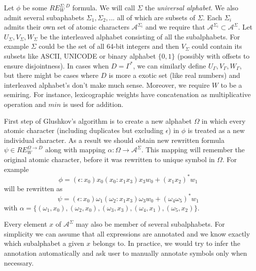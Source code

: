 \documentclass[journal]{journal}
\begin{document}
Let $\phi$ be some $RE_W^{\Sigma:D}$ formula. We will call $\Sigma$ the \textit{universal alphabet}. We also admit several subaphabets $\Sigma_1,\Sigma_2,...$ all of which are subsets of $\Sigma$. Each $\Sigma_i$ admits their own set of atomic characters $\mathcal{A}^{\Sigma_i}$ and we require that $\mathcal{A}^{\Sigma_i}\subset \mathcal{A}^{\Sigma}$.  Let $U_\Sigma,V_\Sigma,W_\Sigma$ be the interleaved alphabet consisting of all the subalphabets. For example $\Sigma$ could be the set of all 64-bit integers and then $V_\Sigma$ could contain its subsets like ASCII, UNICODE or binary alphabet $\{0,1\}$ (possibly with offsets to ensure disjointness). In cases when $D=\Gamma^*$, we can similarly define $U_\Gamma,V_\Gamma,W_\Gamma$, but there might be cases where $D$ is more a exotic set (like real numbers) and interleaved alphabet's don't make much sense. Moreover, we require $W$ to be a semiring. For instance, lexicographic weights have concatenation as multiplicative operation and $min$ is used for addition.

First step of Glushkov's algorithm is to create a new alphabet $\Omega$ in which every atomic character (including duplicates but excluding $\epsilon$) in $\phi$ is treated as a new individual character. As a result we should obtain new rewritten formula 
$\psi \in RE_W^{\Omega \rightarrow D} $ along with mapping $\alpha:\Omega \rightarrow\mathcal{A}^\Sigma$. This mapping will remember the original atomic character, before it was rewritten to unique symbol in $\Omega$.
For example 
\[
\phi=(\epsilon:x_0) x_0(x_0:x_1x_3)x_3 w_0+(x_1x_2)^* w_1
\]
will be rewritten as 
\[
\psi=(\epsilon:x_0) \omega_1(\omega_2:x_1x_3)\omega_3 w_0 + (\omega_4\omega_5)^* w_1
\]
with $\alpha= \{(\omega_1,x_0),(\omega_2,x_0),(\omega_3,x_3),(\omega_4,x_1),(\omega_5,x_2)\}$.

Every element $x$ of $\mathcal{A}^\Sigma$ may also be member of several subalphabets. For simplicity we can assume that all expressions are annotated and we know exactly which subalphabet a given $x$ belongs to. In practice, we would try to infer the annotation automatically and ask user to manually annotate symbols only when necessary.
\end{document}
